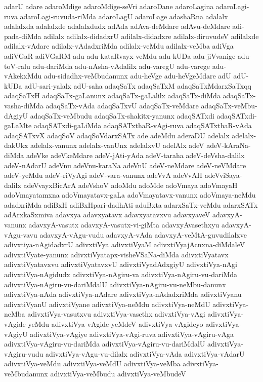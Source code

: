 {adarU
adare
adaroMdige
adaroMdige-seVri
adaroDane
adaroLagina
adaroLagi-ruva
adaroLagi-ruvuda-riMda
adaroLagU
adaroLage
adashaRna
adalalx
adalalxda
adalalxde
adalalxdudx
adAda
adAva-deMdare
adAvu-deMdare
adi-pada-diMda
adilalx
adilalx-didadxrU
adilalx-didadxre
adilalx-diruvudeV
adilalxde
adilalx-vAdare
adilalx-vAdadxriMda
adilalx-veMdu
adilalx-veMba
adiVga
adiVGaR
adiVGaRM
adu
adu-kataRvayx-veMdu
adu-kUDa
adu-jiVvanige
adu-toV-ralu
adu-dariMda
adu-nAsha-vAdalilx
adu-varegU
adu-varege
adu-vAkekxMdu
adu-sidadhx-veMbudanunx
adu-heVge
adu-heVgeMdare
adU
adU-kUDa
adU-sari-yalalx
adU-saha
adaqSaTx
adaqSaTxM
adaqSaTxMdarxSaTxqq
adaqSaTxH
adaqSaTx-gaLanunx
adaqSaTx-gaLalilx
adaqSaTx-diMda
adaqSaTx-vasha-diMda
adaqSaTx-vAda
adaqSaTxvU
adaqSaTx-veMdare
adaqSaTx-veMbu-dAgiyU
adaqSaTx-veMbudu
adaqSaTx-shakitx-yanunx
adaqSATxdi
adaqSATxdi-gaLaMte
adaqSATxdi-gaLiMda
adaqSATxthaR-vAgi-ruva
adaqSATxthaR-vAda
adaqSATxvX
adaqSoV
adaqSoVdarxSATx
ade
adeMdu
aderaDU
adelalx
adelalx-dakUkx
adelalx-vanunx
adelalx-vanUnx
adelalxvU
adelAlx
adeV
adeV-kAraNa-diMda
adeVke
adeVkeMdare
adeV-jAti-yAda
adeV-taraha
adeV-deVsha-dalilx
adeV-nAdarU
adeVnu
adeVnu-karaNa
adeVnU
adeV-neMdare
adeV-neVMdare
adeV-yeMdu
adeV-riVyAgi
adeV-vara-vanunx
adeVvA
adeVvAH
adeVviSaya-dalilx
adeVvayxBicArA
adeVshoV
adoMdu
adoMde
adoVmaya
adoVmayaH
adoVmayatamxna
adoVmayatavx-gaLa
adoVmayatavx-vanunx
adoVmaya-neMdu
adadxriMda
adiBxH
adiBxHpari-dadhAti
aduBxta
adarxSaTx-veMdu
adarxSATx
adArxkaSxmiva
adavxya
adavxyatavx
adavxyatavxvu
adavxyaveV
adavxyA-vanunx
adavxyA-vasutx
adavxyA-vasutx-vi-giMta
adavxyAvasethxyu
adavxyA-vAgu-vavu
adavxyA-vAgu-vudu
adavxyA-vAda
adavxyA-veMtA-guvudilalxve
adivxtiya-nAgidadxrU
adivxtiVya
adivxtiVyaM
adivxtiVyajAcnxna-diMdaleV
adivxtiVyate-yanunx
adivxtiVyatapx-visheVSaNa-diMda
adivxtiVyatavx
adivxtiVyatavxvu
adivxtiVyatavxvU
adivxtiVyadAdxgiyU
adivxtiVya-nAgi
adivxtiVya-nAgidudx
adivxtiVya-nAgiru-va
adivxtiVya-nAgiru-vu-dariMda
adivxtiVya-nAgiru-vu-dariMdalU
adivxtiVya-nAgiru-vu-neMbu-danunx
adivxtiVya-nAda
adivxtiVya-nAdare
adivxtiVya-nAdadxriMda
adivxtiVyanu
adivxtiVyanU
adivxtiVyane
adivxtiVya-neMdu
adivxtiVya-neMdU
adivxtiVya-neMba
adivxtiVya-vasutxvu
adivxtiVya-vasethx
adivxtiVya-vAgi
adivxtiVya-vAgide-yeMdu
adivxtiVya-vAgide-yeMdeV
adivxtiVya-vAgideyo
adivxtiVya-vAgiyU
adivxtiVya-vAgiye
adivxtiVya-vAgi-ruva
adivxtiVya-vAgiru-vAga
adivxtiVya-vAgiru-vu-dariMda
adivxtiVya-vAgiru-vu-dariMdalU
adivxtiVya-vAgiru-vudu
adivxtiVya-vAgu-vu-dilalx
adivxtiVya-vAda
adivxtiVya-vAdarU
adivxtiVya-veMdu
adivxtiVya-veMdU
adivxtiVya-veMba
adivxtiVya-veMbudanunx
adivxtiVya-veMbudu
adivxtiVya-veMbudeV
}
